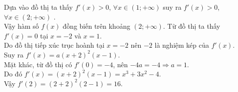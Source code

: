 \begin{ex}
{\begin{itemchoice}
{\begin{tikzpicture}[scale=0.6,line join=round,line cap=round,>=stealth,font=\footnotesize]
				\end{tikzpicture}
			}
			\itemch Dựa vào đồ thị ta thấy $f'(x)>0$, $\forall x\in(1;+\infty)$ suy ra $f'(x)>0$, $\forall x\in(2;+\infty)$ .\\
			Vậy hàm số $f(x)$ đồng biến trên khoảng $(2;+\infty)$.
			\itemch Từ đồ thị ta thấy $f'(x)=0$ tại $x=-2$ và $x=1$.\\
			Do đồ thị tiếp xúc trục hoành tại $x=-2$ nên $-2$ là nghiệm kép của $f'(x)$.\\
			Suy ra $f'(x)=a(x+2)^2(x-1)$.\\
			Mặt khác, từ đồ thị có $f'(0)=-4$, nên $-4a=-4\Rightarrow a=1$.\\
			Do đó $f'(x)=(x+2)^2(x-1)=x^3+3x^2-4$.\\
			Vậy $f'(2)=(2+2)^2(2-1)=16$.
		\end{itemchoice}
	}
\end{ex}

